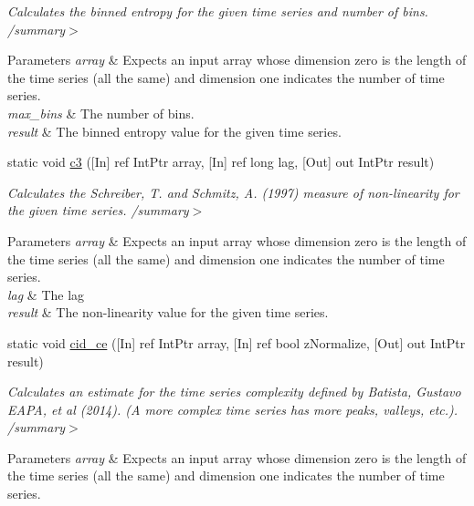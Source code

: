 \begin{DoxyCompactItemize}
\begin{DoxyCompactList}\small\item\em Calculates the binned entropy for the given time series and number of bins. /summary$>$ 
\begin{DoxyParams}{Parameters}
{\em array} & Expects an input array whose dimension zero is the length of the time series (all the same) and dimension one indicates the number of time series.\\
\hline
{\em max\+\_\+bins} & The number of bins.\\
\hline
{\em result} & The binned entropy value for the given time series.\\
\hline
\end{DoxyParams}
\end{DoxyCompactList}\item 
static void \mbox{\hyperlink{classkhiva_1_1interop_1_1_d_l_l_features_ae4a1ae31462928a004613a867ee2fadf}{c3}} (\mbox{[}In\mbox{]} ref Int\+Ptr array, \mbox{[}In\mbox{]} ref long lag, \mbox{[}Out\mbox{]} out Int\+Ptr result)
\begin{DoxyCompactList}\small\item\em Calculates the Schreiber, T. and Schmitz, A. (1997) measure of non-\/linearity for the given time series. /summary$>$ 
\begin{DoxyParams}{Parameters}
{\em array} & Expects an input array whose dimension zero is the length of the time series (all the same) and dimension one indicates the number of time series.\\
\hline
{\em lag} & The lag\\
\hline
{\em result} & The non-\/linearity value for the given time series.\\
\hline
\end{DoxyParams}
\end{DoxyCompactList}\item 
static void \mbox{\hyperlink{classkhiva_1_1interop_1_1_d_l_l_features_a75438219add17f13f41ebd0b852ed8b2}{cid\+\_\+ce}} (\mbox{[}In\mbox{]} ref Int\+Ptr array, \mbox{[}In\mbox{]} ref bool z\+Normalize, \mbox{[}Out\mbox{]} out Int\+Ptr result)
\begin{DoxyCompactList}\small\item\em Calculates an estimate for the time series complexity defined by Batista, Gustavo E\+A\+PA, et al (2014). (A more complex time series has more peaks, valleys, etc.). /summary$>$ 
\begin{DoxyParams}{Parameters}
{\em array} & Expects an input array whose dimension zero is the length of the time series (all the same) and dimension one indicates the number of time series.\\

\end{DoxyParams}
\end{DoxyCompactList}
\end{DoxyCompactItemize}
